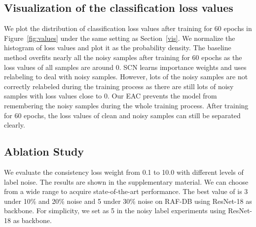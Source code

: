 \documentclass[runningheads]{llncs}
\begin{document}
\subsection{Visualization of the classification loss values}
We plot the distribution of classification loss values after training for 60 epochs in Figure~\ref{fig:values} under the same setting as Section~\ref{vis}. We normalize the histogram of loss values and plot it as the probability density. The baseline method overfits nearly all the noisy samples after training for 60 epochs as the loss values of all samples are around 0. SCN learns importance weights and uses relabeling to deal with noisy samples. However, lots of the noisy samples are not correctly relabeled during the training process as there are still lots of noisy samples with loss values close to 0. Our EAC prevents the model from remembering the noisy samples during the whole training process. After training for 60 epochs, the loss values of clean and noisy samples can still be separated clearly.




\subsection{Ablation Study}
\label{abl}
We evaluate the consistency loss weight  from 0.1 to 10.0 with different levels of label noise. The results are shown in the supplementary material. We can choose  from a wide range to acquire state-of-the-art performance. The best value of  is 3 under 10\% and 20\% noise and 5 under 30\% noise on RAF-DB using ResNet-18 as backbone. For simplicity, we set  as 5 in the noisy label experiments using ResNet-18 as backbone.
\end{document}
